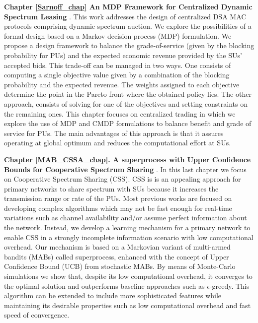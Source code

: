 \textbf{Chapter \ref{Sarnoff_chap} An MDP Framework for Centralized Dynamic Spectrum Leasing} \cite{ref:Alcaraz2012}.
This work addresses the design of centralized DSA MAC protocols comprising dynamic spectrum auction. We explore the possibilities of a formal design based on a Markov decision process (MDP) formulation. We propose a design framework to balance the grade-of-service (given by the blocking probability for PUs) and the expected economic revenue provided by the SUs' accepted bids. 
This trade-off can be managed in two ways. One consists of computing a single objective value given by a combination of the blocking probability and the expected revenue. 
The weights assigned to each objective determine the point in the Pareto front where the obtained policy lies. The other approach, consists of solving for one of the objectives and setting constraints on the remaining ones.
This chapter focuses on centralized trading in which we explore the use of MDP and CMDP formulations to balance benefit and grade of service for PUs. 
The main advantages of this approach is that it assures operating at global optimum and reduces the computational effort at SUs.

\textbf{Chapter \ref{MAB_CSSA_chap}. A superprocess with Upper Confidence Bounds for Cooperative Spectrum Sharing} \cite{ref:Mario2015_MAB_CSSA_1,ref:Mario2015_MAB_CSSA_2}. In this last chapter we focus on Cooperative Spectrum Sharing (CSS). CSS is is an appealing approach for primary networks to share spectrum with SUs because it increases the transmission range or rate of the PUs. Most previous works are focused on developing complex algorithms which may not be fast enough for real-time variations such as channel availability and/or assume perfect information about the network. Instead, we develop a learning mechanism for a primary network to enable CSS in a strongly incomplete information scenario with low computational overhead. Our mechanism is based on a Markovian variant of multi-armed bandits (MABs) called superprocess, enhanced with the concept of Upper Confidence Bound (UCB) from stochastic MABs. By means of Monte-Carlo simulations we show that, despite its low computational overhead, it converges to the optimal solution and outperforms baseline approaches such as $\epsilon$-greedy. This algorithm can be extended to include more sophisticated features while maintaining its desirable properties such as low computational overhead and fast speed of convergence. 


